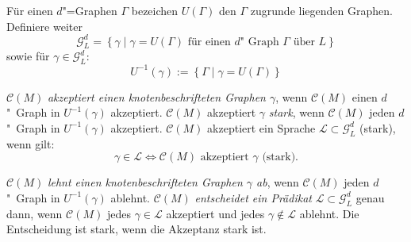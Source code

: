 \documentclass[11pt]{article}
\newcommand{\defWord}[1]{\emph{#1}}
\begin{document}
\begin{definition}
	Für einen $d$"=Graphen $\Gamma$ bezeichen $U(\Gamma)$ den $\Gamma$ zugrunde liegenden Graphen. 
	Definiere weiter 
	\begin{displaymath}
		\mathcal{G}_L^d = \left\{\gamma \mid \gamma = U(\Gamma) \text{ für einen $d$"~Graph } \Gamma \text{ über } L\right\}
	\end{displaymath} sowie für $\gamma \in \mathcal{G}_L^d :$
	\begin{displaymath}
		 U^{-1}(\gamma) := \left\{\Gamma \mid \gamma = U\left(\Gamma\right)\right\}
	\end{displaymath}
	
	$\mathcal{C}(M)$ \defWord{akzeptiert einen knotenbeschrifteten Graphen $\gamma$}, wenn $\mathcal{C}(M)$ einen $d$"~Graph in $U^{-1}(\gamma)$ akzeptiert.
	$\mathcal{C}(M)$ akzeptiert $\gamma$ \defWord{stark}, wenn $\mathcal{C}(M)$ jeden $d$"~Graph in $U^{-1}(\gamma)$ akzeptiert.
	$\mathcal{C}(M)$ akzeptiert ein Sprache $\mathcal{L} \subset \mathcal{G}_L^d$ (stark), wenn gilt: 
	\begin{displaymath}
		\gamma \in \mathcal{L} \iff \mathcal{C}\left(M\right) \text{ akzeptiert } \gamma \text{ (stark).}
	\end{displaymath} 
	
	$\mathcal{C}(M)$ \defWord{lehnt einen knotenbeschrifteten Graphen $\gamma$ ab}, wenn $\mathcal{C}(M)$ jeden $d$"~Graph in $U^{-1}(\gamma)$ ablehnt.
	$\mathcal{C}(M)$ \defWord{entscheidet ein Prädikat} $\mathcal{L} \subset \mathcal{G}_L^d$ genau dann, wenn $\mathcal{C}(M)$ jedes $\gamma \in \mathcal{L}$  akzeptiert und jedes $\gamma \notin \mathcal{L}$ ablehnt.
	Die Entscheidung ist stark, wenn die Akzeptanz stark ist. 
\end{definition}
\end{document}
